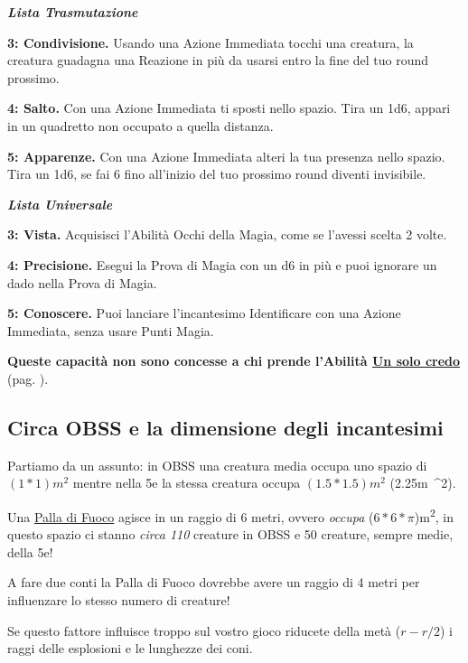 \begin{multicols}{2}
\emph{\textbf{Lista Trasmutazione}}

\textbf{3: Condivisione.} Usando una Azione Immediata tocchi una creatura, la creatura guadagna una Reazione in più da usarsi entro la fine del tuo round prossimo.

\textbf{4: Salto.} Con una Azione Immediata ti sposti nello spazio. Tira un 1d6, appari in un quadretto non occupato a quella distanza.

\textbf{5: Apparenze.} Con una Azione Immediata alteri la tua presenza nello spazio. Tira un 1d6, se fai 6 fino all'inizio del tuo prossimo round diventi invisibile.

\emph{\textbf{Lista Universale}}

\textbf{3: Vista.} Acquisisci l'Abilità Occhi della Magia, come se l'avessi scelta 2 volte.

\textbf{4: Precisione.} Esegui la Prova di Magia con un d6 in più e puoi ignorare un dado nella Prova di Magia.

\textbf{5: Conoscere.} Puoi lanciare l'incantesimo Identificare con una Azione Immediata, senza usare Punti Magia.

\textbf{Queste capacità non sono concesse a chi prende l'Abilità \hyperlink{Un solo credo}{Un solo credo}} (pag. \pageref{Un solo credo}).





\subsection*{Circa OBSS e la dimensione degli incantesimi}

Partiamo da un assunto: in OBSS una creatura media occupa uno spazio di $(1*1)\si{m^{2}}$ mentre nella 5e la stessa creatura occupa $(1.5*1.5)\si{m{^2}}$ (2.25\si{m{^2}}).

Una \hyperlink{Palla di Fuoco}{Palla di Fuoco} agisce in un raggio di 6 metri, ovvero \emph{occupa} ($6*6*\pi$)\si{m^{2}}, in questo spazio ci stanno \emph{circa 110} creature in OBSS e 50 creature, sempre medie, della 5e!

A fare due conti la Palla di Fuoco dovrebbe avere un raggio di 4 metri per influenzare lo stesso numero di creature!

Se questo fattore influisce troppo sul vostro gioco riducete della metà ($r-r/2$) i raggi delle esplosioni e le lunghezze dei coni.

\end{multicols}

